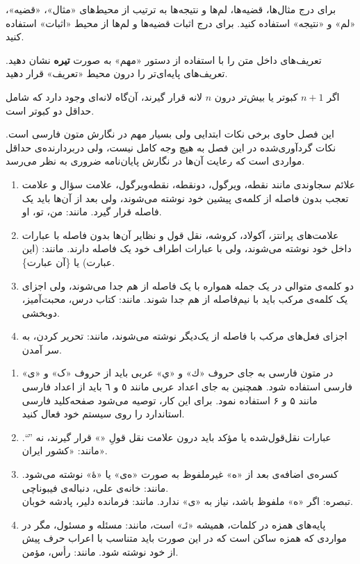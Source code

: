 برای درج مثال‌ها، قضیه‌ها، لم‌ها و نتیجه‌ها به ترتیب از محیط‌های
«مثال»، «قضیه»، «لم» و «نتیجه» استفاده کنید.
برای درج اثبات قضیه‌ها و لم‌ها  از محیط «اثبات» استفاده کنید.

تعریف‌های داخل متن را با استفاده از دستور «مهم» به صورت \textbf{تیره‌} نشان دهید.
تعریف‌های پایه‌ای‌تر را درون محیط «تعریف» قرار دهید.

\begin{تعریف}
اگر $n+1$ کبوتر یا بیش‌تر درون  $n$ لانه قرار گیرند، آن‌گاه لانه‌ای 
وجود دارد که شامل حداقل دو کبوتر است.
\end{تعریف}

این فصل حاوی برخی نکات ابتدایی ولی بسیار مهم در نگارش متون فارسی است. 
نکات گردآوری‌شده در این فصل به‌ هیچ‌ وجه کامل نیست، 
ولی دربردارنده‌ی حداقل مواردی است که رعایت آن‌ها در نگارش پایان‌نامه ضروری به نظر می‌رسد.

\begin{enumerate}

\item 
علائم سجاوندی مانند نقطه، ویرگول، دونقطه، نقطه‌ویرگول، علامت سؤال و علامت تعجب %
بدون فاصله از کلمه‌ی پیشین خود نوشته می‌شوند، ولی بعد از آن‌ها باید یک فاصله‌ قرار گیرد. مانند: من، تو، او.
\item 
علامت‌های پرانتز، آکولاد، کروشه، نقل قول و نظایر آن‌ها بدون فاصله با عبارات داخل خود نوشته می‌شوند، ولی با عبارات اطراف خود یک فاصله دارند. مانند: (این عبارت) یا \{آن عبارت\}.
\item 
دو کلمه‌ی متوالی در یک جمله همواره با یک فاصله از هم جدا می‌شوند، ولی اجزای یک کلمه‌ی مرکب باید با نیم‌فاصله‌‌
 از هم جدا شوند. مانند: کتاب درس، محبت‌آمیز، دوبخشی.
 \item 
 اجزای فعل‌های مرکب با فاصله از یک‌دیگر نوشته می‌شوند، مانند: تحریر کردن، به سر آمدن.
\end{enumerate}

\begin{enumerate}

\item 
در متون فارسی به جای حروف «ك» و «ي» عربی باید از حروف «ک» و «ی» فارسی استفاده شود. همچنین به جای اعداد عربی مانند ٥ و ٦ باید از اعداد فارسی مانند ۵ و ۶ استفاده نمود. 
برای این کار، توصیه می‌شود صفحه‌کلید‌ فارسی استاندارد را روی سیستم خود فعال کنید.
\item 
عبارات نقل‌قول‌شده یا مؤکد باید درون علامت نقل قولِ «» قرار گیرند، نه ''``. مانند: «کشور ایران».
\item 
کسره‌ی اضافه‌ی بعد از «ه» غیرملفوظ به صورت «ه‌ی» یا «هٔ» نوشته می‌شود. مانند: خانه‌ی علی، دنباله‌ی فیبوناچی.
\\
تبصره‌: اگر «ه» ملفوظ باشد، نیاز به «‌ی» ندارد. مانند: فرمانده دلیر، پادشه خوبان. 

\item 
پایه‌های همزه در کلمات، همیشه «ئـ» است، مانند: مسئله و مسئول، مگر در مواردی که همزه ساکن است که در این ‌صورت باید متناسب با اعراب حرف پیش از خود نوشته شود. مانند: رأس، مؤمن. 

\end{enumerate}

